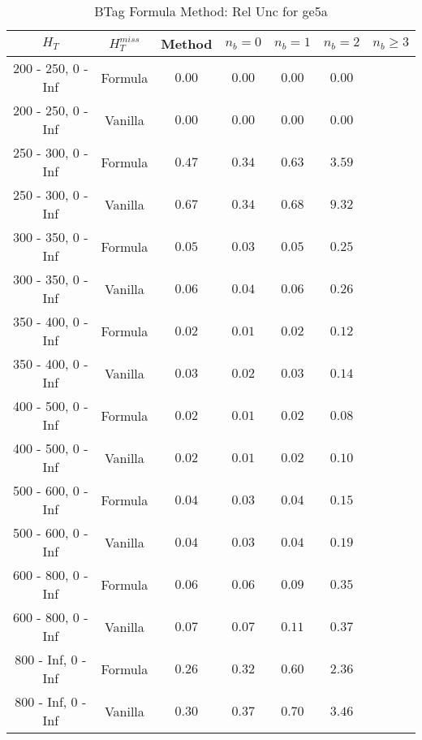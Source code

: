 \begin{longtable}{ | c | c | c | c | c | c | c | }
\caption{BTag Formula Method: Rel Unc for ge5a} \label{tab:ge5a} \\    \hline 
$H_{T}$ & $H_{T}^{miss}$ & Method & $n_{b} = 0$ & $n_{b} = 1$ & $n_{b} = 2$ & $n_{b} \ge 3$ \\ \hline 200 -  250,    0 -  Inf & Formula  & $  0.00 $ & $  0.00 $ & $  0.00 $ & $  0.00 $  \\  
 200 -  250,    0 -  Inf & Vanilla  & $  0.00 $ & $  0.00 $ & $  0.00 $ & $  0.00 $  \\ \hline 
 250 -  300,    0 -  Inf & Formula  & $  0.47 $ & $  0.34 $ & $  0.63 $ & $  3.59 $  \\  
 250 -  300,    0 -  Inf & Vanilla  & $  0.67 $ & $  0.34 $ & $  0.68 $ & $  9.32 $  \\ \hline 
 300 -  350,    0 -  Inf & Formula  & $  0.05 $ & $  0.03 $ & $  0.05 $ & $  0.25 $  \\  
 300 -  350,    0 -  Inf & Vanilla  & $  0.06 $ & $  0.04 $ & $  0.06 $ & $  0.26 $  \\ \hline 
 350 -  400,    0 -  Inf & Formula  & $  0.02 $ & $  0.01 $ & $  0.02 $ & $  0.12 $  \\  
 350 -  400,    0 -  Inf & Vanilla  & $  0.03 $ & $  0.02 $ & $  0.03 $ & $  0.14 $  \\ \hline 
 400 -  500,    0 -  Inf & Formula  & $  0.02 $ & $  0.01 $ & $  0.02 $ & $  0.08 $  \\  
 400 -  500,    0 -  Inf & Vanilla  & $  0.02 $ & $  0.01 $ & $  0.02 $ & $  0.10 $  \\ \hline 
 500 -  600,    0 -  Inf & Formula  & $  0.04 $ & $  0.03 $ & $  0.04 $ & $  0.15 $  \\  
 500 -  600,    0 -  Inf & Vanilla  & $  0.04 $ & $  0.03 $ & $  0.04 $ & $  0.19 $  \\ \hline 
 600 -  800,    0 -  Inf & Formula  & $  0.06 $ & $  0.06 $ & $  0.09 $ & $  0.35 $  \\  
 600 -  800,    0 -  Inf & Vanilla  & $  0.07 $ & $  0.07 $ & $  0.11 $ & $  0.37 $  \\ \hline 
 800 -  Inf,    0 -  Inf & Formula  & $  0.26 $ & $  0.32 $ & $  0.60 $ & $  2.36 $  \\  
 800 -  Inf,    0 -  Inf & Vanilla  & $  0.30 $ & $  0.37 $ & $  0.70 $ & $  3.46 $  \\ \hline 
    \hline 
    \hline 
\end{longtable}

